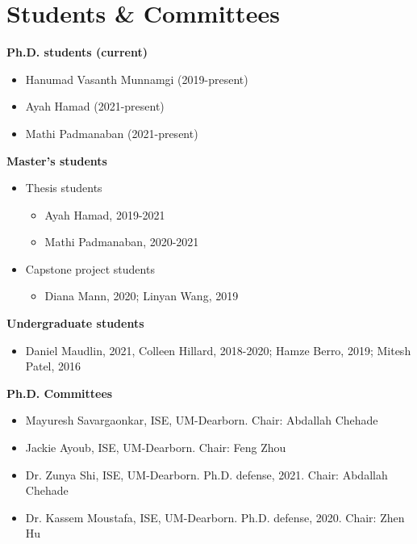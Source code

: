\documentclass[11pt]{article}
\newenvironment{main}
{\begin{adjustwidth}{3em}{}}
{\end{adjustwidth}}
\begin{document}
\section*{Students \& Committees}
\begin{main}

\textbf{Ph.D. students (current)}
\begin{itemize}
    \item Hanumad Vasanth Munnamgi (2019-present)
    \item Ayah Hamad (2021-present)
    \item Mathi Padmanaban (2021-present)
\end{itemize}

\textbf{Master's students}
\begin{itemize}
    \item Thesis students
        \begin{itemize}
            \item Ayah Hamad, 2019-2021
            \item Mathi Padmanaban, 2020-2021
        \end{itemize}
    \item Capstone project students
        \begin{itemize}
            \item Diana Mann, 2020; Linyan Wang, 2019
        \end{itemize}
\end{itemize}

\textbf{Undergraduate students}
\begin{itemize}
    \item Daniel Maudlin, 2021, Colleen Hillard, 2018-2020; Hamze Berro, 2019; Mitesh Patel, 2016
\end{itemize}

\textbf{Ph.D. Committees}
\begin{itemize}
    \item Mayuresh Savargaonkar, ISE, UM-Dearborn. Chair: Abdallah Chehade
    \item Jackie Ayoub, ISE, UM-Dearborn. Chair: Feng Zhou
    \item Dr. Zunya Shi, ISE, UM-Dearborn. Ph.D. defense, 2021. Chair: Abdallah Chehade
    \item Dr. Kassem Moustafa, ISE, UM-Dearborn. Ph.D. defense, 2020. Chair: Zhen Hu
\end{itemize}


\end{main}
\end{document}
